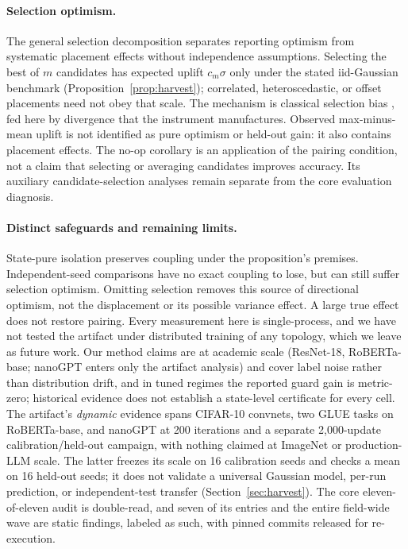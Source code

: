 \paragraph{Selection optimism.}
The general selection decomposition separates reporting optimism from
systematic placement effects without independence assumptions. Selecting
the best of $m$ candidates has expected uplift $c_m\sigma$ only under the
stated iid-Gaussian benchmark (Proposition~\ref{prop:harvest}); correlated,
heteroscedastic, or offset placements need not obey that scale. The mechanism is classical
selection bias \citep{cawley2010overfitting}, fed here by divergence that the
instrument manufactures. Observed max-minus-mean uplift is not identified
as pure optimism or held-out gain: it also contains placement effects.
The no-op corollary is an application of the pairing condition, not a
claim that selecting or averaging candidates improves accuracy. Its
auxiliary candidate-selection analyses remain separate from the core
evaluation diagnosis.

\paragraph{Distinct safeguards and remaining limits.}
State-pure isolation preserves coupling under the proposition's premises.
Independent-seed comparisons have no exact coupling to lose, but can still
suffer selection optimism. Omitting selection removes this source of
directional optimism, not the displacement or its possible variance effect.
A large true effect does not restore pairing. Every measurement
here is single-process, and we have not tested the artifact under distributed
training of any topology, which we leave as future work. Our method
claims are at academic scale (ResNet-18, RoBERTa-base; nanoGPT enters only the
artifact analysis) and cover label noise rather than distribution drift, and in
tuned regimes the reported guard gain is metric-zero; historical evidence
does not establish a state-level certificate for every cell. The artifact's \emph{dynamic}
evidence spans CIFAR-10 convnets, two GLUE tasks on RoBERTa-base, and nanoGPT
at 200 iterations and a separate 2,000-update calibration/held-out campaign,
with nothing claimed at ImageNet or production-LLM scale. The latter freezes
its scale on 16 calibration seeds and checks a mean on 16 held-out seeds;
it does not validate a universal Gaussian model, per-run prediction, or
independent-test transfer (Section~\ref{sec:harvest}). The core eleven-of-eleven audit is double-read,
and seven of its entries and the entire field-wide wave are static findings,
labeled as such, with pinned commits released for re-execution.
